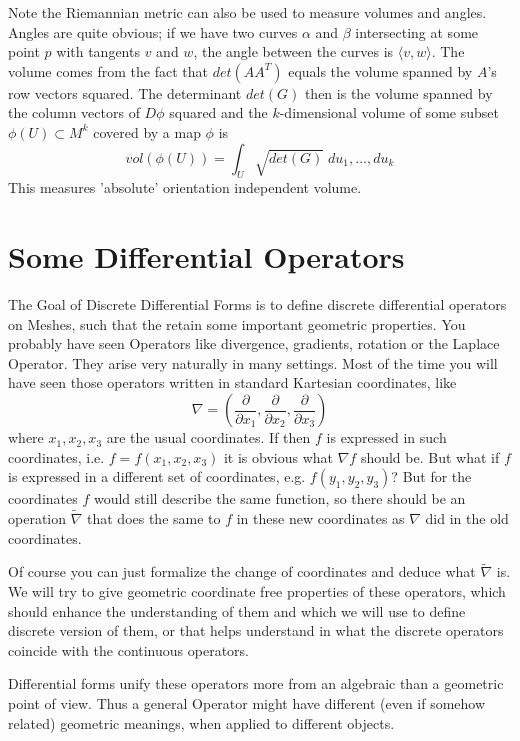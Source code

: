 Note the Riemannian metric can also be used to measure volumes and angles. Angles are quite obvious; if we have two curves $\alpha$ and $\beta$ intersecting at some point $p$ with tangents $v$ and $w$, the angle between the curves is $\langle v,w\rangle$. The volume comes from the fact that $det(A A^T)$ equals the volume spanned by $A$'s row vectors squared. The determinant $det(G)$ then is the volume spanned by the column vectors of $D\phi$ squared and the $k$-dimensional volume of some subset $\phi(U) \subset M^k$ covered by a map $\phi$ is
\[vol(\phi(U))= \int_U \sqrt{det(G)}\;du_1,...,du_k\]
This measures 'absolute' orientation independent volume.



\section{Some Differential Operators}

The Goal of Discrete Differential Forms is to define discrete differential operators on Meshes, such that the retain some important geometric properties. 
You probably have seen Operators like divergence, gradients, rotation or the Laplace Operator. They arise very naturally in many settings. Most of the time you will have seen those operators written in standard Kartesian coordinates, like
\[\nabla = (\frac{ \partial}{\partial x_1},\frac{ \partial}{\partial x_2},\frac{ \partial}{\partial x_3})\]
where $x_1, x_2, x_3$ are the usual coordinates. If then $f$ is expressed in such coordinates, i.e. $f = f(x_1,x_2,x_3)$ it is obvious what $\nabla f$ should be. But what if $f$ is expressed in a different set of coordinates, e.g. $f(y_1,y_2,y_3)$? But for the coordinates $f$ would still describe the same function, so there should be an operation $\tilde{\nabla}$ that does the same to $f$ in these new coordinates as $\nabla$ did in the old coordinates.

Of course you can just formalize the change of coordinates and deduce what $\tilde{\nabla}$ is. We will try to give geometric coordinate free properties of these operators, which should enhance the understanding of them and which we will use to define discrete version of them, or that helps understand in what the discrete operators coincide with the continuous operators.

Differential forms unify these operators more from an algebraic than a geometric point of view. Thus a general Operator might have different (even if somehow related) geometric meanings, when applied to different objects.

